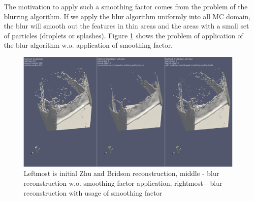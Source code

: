 The motivation to apply such a smoothing factor comes from the problem of the blurring algorithm. If we apply the blur algorithm uniformly into all MC domain, the blur will smooth out the features in thin areas and the areas with a small set of particles (droplets or splashes). Figure \ref{fig:smoothing_factor_influence} shows the problem of application of the blur algorithm w.o. application of smoothing factor.

\begin{figure}[H]
	\begin{center}
			\includegraphics[width=\textwidth]{figures/View2.png}		
	\end{center}
	\caption{Leftmost is initial Zhu and Bridson reconstruction, middle - blur reconstruction w.o. smoothing factor application, rightmost - blur reconstruction with usage of smoothing factor}
	\label{fig:smoothing_factor_influence}
\end{figure}


